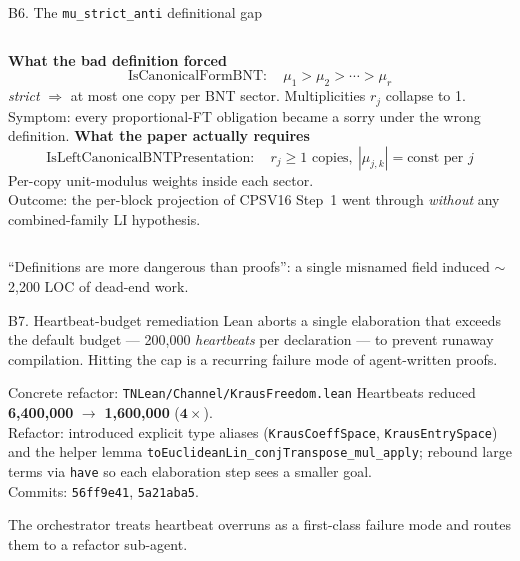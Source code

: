 \documentclass[aspectratio=169,10pt]{beamer}
\begin{document}
\begin{frame}{B6. The \texttt{mu\_strict\_anti} definitional gap}
    \begin{columns}[T]
        \textcolor{softred}{\textbf{What the bad definition forced}}
        \[
            \mathrm{IsCanonicalFormBNT}: \quad \mu_1 > \mu_2 > \cdots > \mu_r
        \]
        \emph{strict} $\Rightarrow$ at most one copy per BNT sector. Multiplicities $r_j$ collapse to 1.
        \vspace{0.4em}
        \\
        \textcolor{softred}{Symptom:} every proportional-FT obligation became a sorry under the wrong definition.
        \textcolor{leangreen}{\textbf{What the paper actually requires}}
        \[
            \mathrm{IsLeftCanonicalBNTPresentation}: \quad r_j \geq 1 \text{ copies}, \ |\mu_{j,k}| = \text{const per }j
        \]
        Per-copy unit-modulus weights inside each sector.
        \vspace{0.4em}
        \\
        \textcolor{leangreen}{Outcome:} the per-block projection of CPSV16 Step~1 went through \emph{without} any combined-family LI hypothesis.
    \end{columns}
    \vspace{0.6em}
    \textcolor{dimwhite}{\footnotesize \community{} ``Definitions are more dangerous than proofs'': a single misnamed field induced $\sim$2{,}200 LOC of dead-end work.}
\end{frame}

\begin{frame}{B7. Heartbeat-budget remediation}
    Lean aborts a single elaboration that exceeds the default budget --- 200{,}000 \emph{heartbeats} per declaration --- to prevent runaway compilation. Hitting the cap is a recurring failure mode of agent-written proofs.
    \vspace{0.6em}
    \begin{block}{Concrete refactor: \texttt{TNLean/Channel/KrausFreedom.lean}}
        \footnotesize
        Heartbeats reduced \textbf{\textcolor{softred}{6{,}400{,}000}} $\to$ \textbf{\textcolor{leangreen}{1{,}600{,}000}} ($\mathbf{4\times}$).
        \\[3pt]
        Refactor: introduced explicit type aliases (\texttt{KrausCoeffSpace}, \texttt{KrausEntrySpace}) and the helper lemma \texttt{toEuclideanLin\_conjTranspose\_mul\_apply}; rebound large terms via \texttt{have} so each elaboration step sees a smaller goal.
        \\[3pt]
        Commits: \texttt{56ff9e41}, \texttt{5a21aba5}.
    \end{block}
    \vspace{0.4em}
    \textcolor{dimwhite}{\footnotesize The orchestrator treats heartbeat overruns as a first-class failure mode and routes them to a refactor sub-agent.}
\end{frame}
\end{document}
